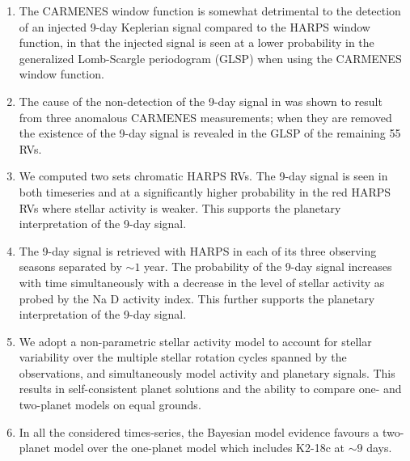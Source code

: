 \begin{enumerate}
\item The CARMENES window function is somewhat detrimental to the detection of an injected 9-day Keplerian
  signal compared to the HARPS window function, in that the injected signal is seen at a lower probability in
  the generalized Lomb-Scargle periodogram (GLSP) when using the CARMENES window function.
\item The cause of the non-detection of the 9-day signal in  was shown to result from
  three anomalous CARMENES measurements; when they are removed  the existence of the 9-day signal is revealed in the GLSP
  of the remaining 55 RVs.
\item We computed two sets chromatic HARPS RVs. The 9-day
  signal is seen in both timeseries and at a significantly higher probability in the red HARPS RVs where stellar
  activity is weaker. This supports the planetary interpretation of the 9-day signal.
\item The 9-day signal is retrieved with HARPS in each of its three observing seasons separated by $\sim 1$ year.
  The probability of the 9-day signal increases with time simultaneously with a decrease in the level of stellar
  activity as probed by the Na D activity index. This further supports the planetary interpretation of the 9-day
  signal.
\item We adopt a non-parametric stellar activity model to account for stellar variability over the multiple stellar
  rotation cycles spanned by the observations, and simultaneously model activity and planetary signals. This results in
  self-consistent planet solutions and the ability to compare one- and two-planet models on equal grounds.
\item In all the considered times-series, the Bayesian model evidence favours a two-planet model over the one-planet model which
  includes K2-18c at $\sim 9$ days.
\end{enumerate}

